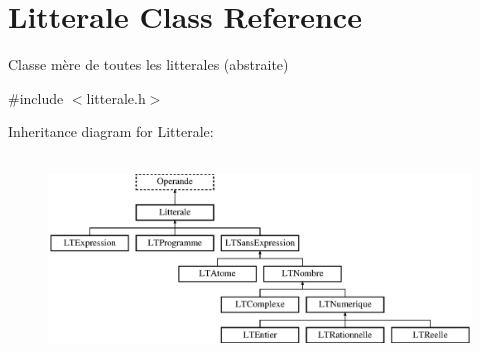 \hypertarget{class_litterale}{}\section{Litterale Class Reference}
\label{class_litterale}


Classe mère de toutes les litterales (abstraite)  




{\ttfamily \#include $<$litterale.\+h$>$}

Inheritance diagram for Litterale\+:\begin{figure}[H]
\begin{center}
\leavevmode
\includegraphics[height=5.419354cm]{class_litterale}
\end{center}
\end{figure}
